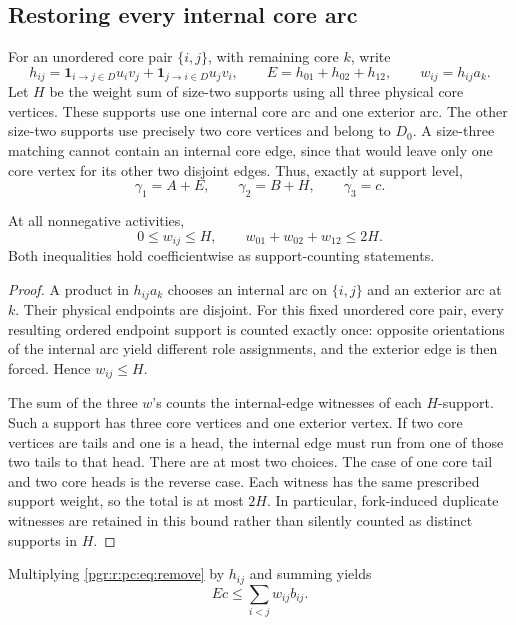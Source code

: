 \documentclass[11pt]{article}
\numberwithin{equation}{section}
\theoremstyle{definition}\newtheorem{definition}[theorem]{Definition}\newtheorem{remark}[theorem]{Remark}
\begin{document}
\subsection{Restoring every internal core arc}
For an unordered core pair $\{i,j\}$, with remaining core $k$, write
\[
 h_{ij}=\mathbf1_{i\to j\in D}u_iv_j+
         \mathbf1_{j\to i\in D}u_jv_i,\qquad
 E=h_{01}+h_{02}+h_{12},\qquad w_{ij}=h_{ij}a_k.
\]
Let $H$ be the weight sum of size-two supports using all three physical core
vertices. These supports use one internal core arc and one exterior arc.
The other size-two supports use precisely two core vertices and belong to
$D_0$. A size-three matching cannot contain an internal core edge, since
that would leave only one core vertex for its other two disjoint edges.
Thus, exactly at support level,
\begin{equation}\label{pgr:r:pc:eq:decomposition}
 \gamma_1=A+E,\qquad \gamma_2=B+H,\qquad\gamma_3=c.
\end{equation}

\begin{lemma}\label{pgr:r:pc:lem:witnesses}
At all nonnegative activities,
\begin{equation}\label{pgr:r:pc:eq:witnessbounds}
 0\le w_{ij}\le H,\qquad w_{01}+w_{02}+w_{12}\le2H.
\end{equation}
Both inequalities hold coefficientwise as support-counting statements.
\end{lemma}
\begin{proof}
A product in $h_{ij}a_k$ chooses an internal arc on $\{i,j\}$ and an exterior
arc at $k$. Their physical endpoints are disjoint. For this fixed unordered
core pair, every resulting ordered endpoint support is counted exactly once:
opposite orientations of the internal arc yield different role assignments,
and the exterior edge is then forced. Hence $w_{ij}\le H$.

The sum of the three $w$'s counts the internal-edge witnesses of each
$H$-support. Such a support has three core vertices and one exterior vertex.
If two core vertices are tails and one is a head, the internal edge must run
from one of those two tails to that head. There are at most two choices.
The case of one core tail and two core heads is the reverse case. Each
witness has the same prescribed support weight, so the total is at most
$2H$. In particular, fork-induced duplicate witnesses are retained in this
bound rather than silently counted as distinct supports in $H$.
\end{proof}
Multiplying \eqref{pgr:r:pc:eq:remove} by $h_{ij}$ and summing yields
\begin{equation}\label{pgr:r:pc:eq:Ec}
 Ec\le\sum_{i<j} w_{ij}b_{ij}.
\end{equation}
\end{document}
